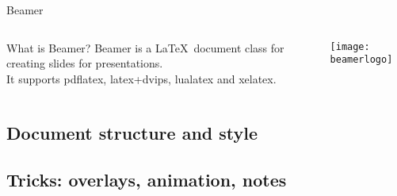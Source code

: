 \graphicspath{{sec02/images/}{sec02/code/}}
\lstset{inputpath=sec02/code/}


\begin{frame}[t]{Beamer}
    \begin{columns}
    \begin{column}{0.65\textwidth}
        \begin{block}{What is Beamer?}
            Beamer is a \LaTeX\ document class for creating slides for presentations. \\
            It supports pdflatex, latex+dvips, lualatex and xelatex.
        \end{block}
    \end{column}
    \begin{column}{0.3\textwidth}
        \begin{center}
            \texttt{[image: beamerlogo]}
        \end{center}
    \end{column}
    \end{columns}
\end{frame}



\subsection{Document structure and style}


\subsection{Tricks: overlays, animation, notes}

